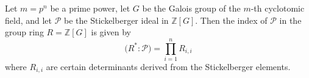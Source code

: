 Let $m = p^n$ be a prime power, let $G$ be the Galois group of the $m$-th cyclotomic field, and let $\mathcal{P}$ be the Stickelberger ideal in $\mathbb{Z}[G]$. Then the index of $\mathcal{P}$ in the group ring $R = \mathbb{Z}[G]$ is given by
$$\bigl(R^* : \mathcal{P}\bigr) = \prod_{i=1}^{n} R_{i,i}$$
where $R_{i,i}$ are certain determinants derived from the Stickelberger elements.
